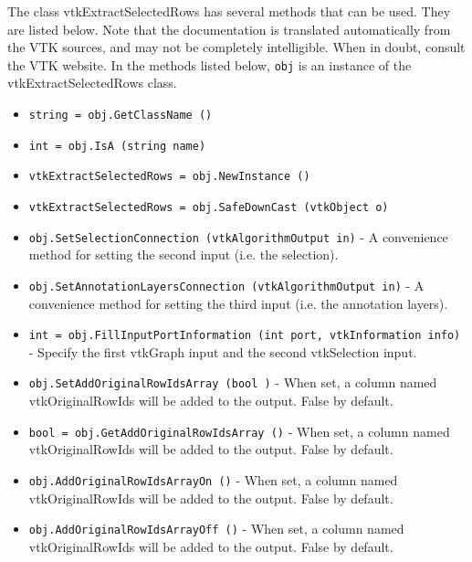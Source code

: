 The class vtkExtractSelectedRows has several methods that can be used.
  They are listed below.
Note that the documentation is translated automatically from the VTK sources,
and may not be completely intelligible.  When in doubt, consult the VTK website.
In the methods listed below, \verb|obj| is an instance of the vtkExtractSelectedRows class.
\begin{itemize}
\item  \verb|string = obj.GetClassName ()|

\item  \verb|int = obj.IsA (string name)|

\item  \verb|vtkExtractSelectedRows = obj.NewInstance ()|

\item  \verb|vtkExtractSelectedRows = obj.SafeDownCast (vtkObject o)|

\item  \verb|obj.SetSelectionConnection (vtkAlgorithmOutput in)| -  A convenience method for setting the second input (i.e. the selection).

\item  \verb|obj.SetAnnotationLayersConnection (vtkAlgorithmOutput in)| -  A convenience method for setting the third input (i.e. the annotation layers).

\item  \verb|int = obj.FillInputPortInformation (int port, vtkInformation info)| -  Specify the first vtkGraph input and the second vtkSelection input.

\item  \verb|obj.SetAddOriginalRowIdsArray (bool )| -  When set, a column named vtkOriginalRowIds will be added to the output.
 False by default.

\item  \verb|bool = obj.GetAddOriginalRowIdsArray ()| -  When set, a column named vtkOriginalRowIds will be added to the output.
 False by default.

\item  \verb|obj.AddOriginalRowIdsArrayOn ()| -  When set, a column named vtkOriginalRowIds will be added to the output.
 False by default.

\item  \verb|obj.AddOriginalRowIdsArrayOff ()| -  When set, a column named vtkOriginalRowIds will be added to the output.
 False by default.

\end{itemize}
